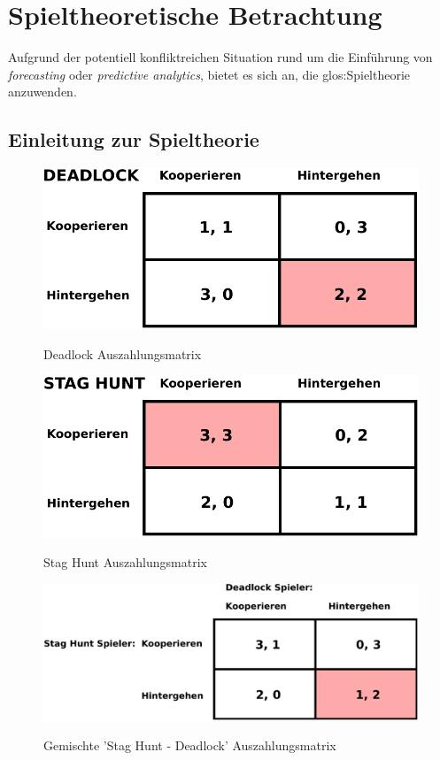 \section{Spieltheoretische Betrachtung}

Aufgrund der potentiell konfliktreichen Situation rund um die Einführung von
\emph{forecasting} oder \emph{predictive analytics}, bietet es sich an, die
\gls{glos:Spieltheorie} anzuwenden.

\subsection{Einleitung zur Spieltheorie}


\begin{figure}%
\centering
\caption{Deadlock Auszahlungsmatrix}
\includegraphics[scale=0.8]{Grafiken/Deadlock_Ink.pdf} 
\label{pic:Deadlock}
\end{figure}

\begin{figure}%
\centering
\caption{Stag Hunt Auszahlungsmatrix}
\includegraphics[scale=0.8]{Grafiken/Stag_Hunt_Ink.pdf} 
\label{pic:StagHunt}
\end{figure}

\begin{figure}%
\centering
\caption{Gemischte 'Stag Hunt - Deadlock' Auszahlungsmatrix}
\includegraphics[scale=0.7]{Grafiken/Mixed_Ink.pdf} 
\label{pic:Mixed}
\end{figure}

